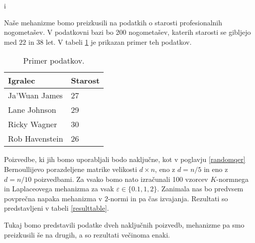 i\documentclass[mat1]{fmfdelo}
\begin{document}
Naše mehanizme bomo preizkusili na podatkih o starosti profesionalnih nogometašev. V podatkovni bazi bo 200 nogometašev, katerih starosti se gibljejo med $22$ in $38$ let. V tabeli \ref{sampletable} je prikazan primer teh podatkov.

\begin{table}[!htb]
\begin{tabular}{|l|l|}
\hline
\textbf{Igralec} & \textbf{Starost} \\ \hline
Ja’Wuan James    & 27               \\ \hline
Lane Johnson     & 29               \\ \hline
Ricky Wagner     & 30               \\ \hline
Rob Havenstein   & 26               \\ \hline
\end{tabular}
\caption{Primer podatkov.} \label{sampletable}
\end{table}

Poizvedbe, ki jih bomo uporabljali bodo naključne, kot v poglavju \ref{randomqer} Bernoullijevo porazdeljene matrike velikosti $d \times n$, eno z $d=n/5$ in eno z $d=n/10$ poizvedbami. Za vsako bomo nato izračunali 100 vzorcev $K$-normnega in Laplaceovega mehanizma za vsak $\varepsilon \in \{0.1, 1, 2\}$. Zanimala nas bo predvsem povprečna napaka mehanizma v $2$-normi in pa čas izvajanja. Rezultati so predstavljeni v tabeli \ref{resulttable}.

\begin{opomba}
    Tukaj bomo predstavili podatke dveh naključnih poizvedb, mehanizme pa smo preizkusili še na drugih, a so rezultati večinoma enaki.
\end{opomba}
\end{document}
